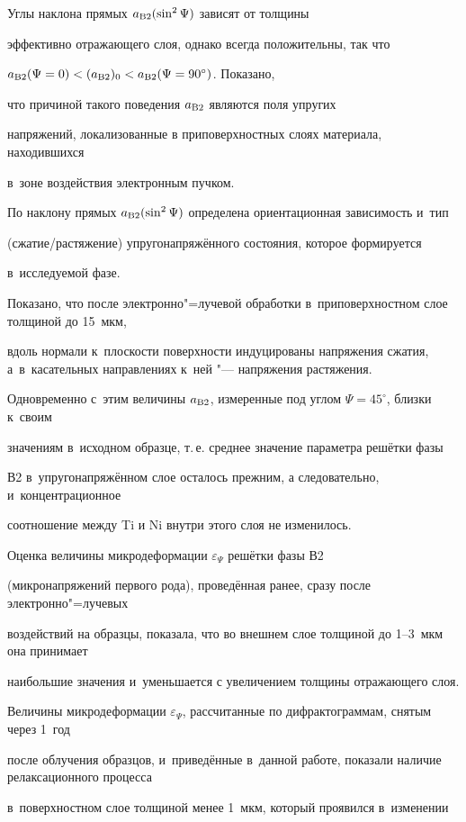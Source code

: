 Углы наклона прямых $a_{\rm B2}(\sin^{2}\Psi )$ зависят от толщины

эффективно отражающего слоя, однако всегда положительны, так что

$a_{\rm B2}(\Psi=0)<(a_{\rm B2})_{0}<a_{\rm B2}(\Psi =90^\circ)$. Показано,

что причиной такого поведения $a_{\rm B2}$ являются поля упругих

напряжений, локализованные в приповерхностных слоях материала, находившихся

в~зоне воздействия электронным пучком.

По наклону прямых $a_{\rm B2}(\sin^{2}\Psi )$ определена ориентационная зависимость и~тип

(сжатие/растяжение) упругонапряжённого состояния, которое формируется

в~исследуемой фазе.

Показано, что после электронно"=лучевой обработки в~приповерхностном слое толщиной до 15~мкм,

вдоль нормали к~плоскости поверхности индуцированы напряжения сжатия, а~в~касательных направлениях к~ней "--- напряжения растяжения.

Одновременно с~этим величины $a_{\rm B2}$, измеренные под углом $\Psi =45^\circ$, близки к~своим

значениям в~исходном образце, т.\,е. среднее значение параметра решётки фазы

В2 в~упругонапряжённом слое осталось прежним, а следовательно, и~концентрационное

соотношение между Ti и Ni внутри этого слоя не изменилось.



Оценка величины микродеформации $\varepsilon_{\Psi }$ решётки фазы В2

(микронапряжений первого рода), проведённая ранее, сразу после электронно"=лучевых

воздействий на образцы, показала, что во внешнем слое толщиной до 1--3~мкм она принимает

наибольшие значения и~уменьшается с увеличением толщины отражающего слоя.

Величины микродеформации $\varepsilon _{\Psi }$, рассчитанные по дифрактограммам, снятым через 1~год

после облучения образцов, и~приведённые в~данной работе, показали наличие релаксационного процесса

в~поверхностном слое толщиной менее 1~мкм, который проявился в~изменении

